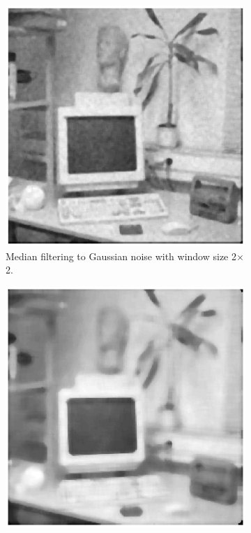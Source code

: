 \documentclass[11pt,a4paper]{article}
\begin{document}
\begin{itemize}
	\begin{figure}[!ht]
		\centering 
		\begin{subfigure}[t]{.32\linewidth} %
			\includegraphics[width=\columnwidth]{Q17_Med_to_Gauss_2_2.eps}
			\caption{\scriptsize Median filtering to Gaussian noise with window size 2$\times$2.}
			\label{fig:medToGauss2*2}
		\end{subfigure}
		\begin{subfigure}[t]{.32\linewidth} %
			\includegraphics[width=\columnwidth]{Q17_Med_to_Gauss_3_3.eps}

\end{subfigure}
\end{figure}
\end{itemize}
\end{document}
